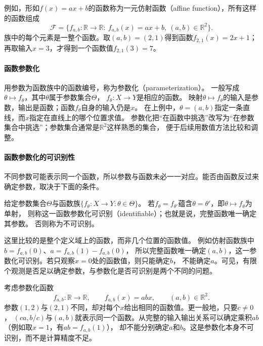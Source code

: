 例如，形如$f(x)=ax+b$的函数称为一元仿射函数（affine function），所有这样的函数组成
\[
 \mathcal F=\{f_{a,b}:\mathbb R\to\mathbb R:\ f_{a,b}(x)=ax+b,\ (a,b)\in\mathbb R^2\}.
\]
族中的每个元素是一整个函数。取$(a,b)=(2,1)$得到函数$f_{2,1}(x)=2x+1$；
再取输入$x=3$，才得到一个函数值$f_{2,1}(3)=7$。

\paragraph{函数参数化}
用参数为函数族中的函数编号，称为参数化（parameterization）。
一般写成$\theta\mapsto f_\theta$，其中$\theta$属于参数集合$\Theta$，
$f_\theta:X\to Y$是相应的函数。
映射$\theta\mapsto f_\theta$的输入是参数，输出是函数；函数$f_\theta$自身的输入仍是$x$。
在上例中，$\theta=(a,b)$指定一条直线，而$x$指定在直线上的哪个位置求值。
参数化把“在函数中挑选”改写为“在参数集合中挑选”；参数集合通常是$\mathbb R^2$这样熟悉的集合，
便于后续用数值方法比较和调整。

\paragraph{函数参数化的可识别性}
不同参数可能表示同一个函数，所以参数与函数未必一一对应。能否由函数反过来确定参数，取决于下面的条件。
\begin{definition}[函数参数化的可识别性]
\label{def:prelim-identifiable-parameterization}
给定参数集合$\Theta$与函数族$\{f_\theta:X\to Y:\theta\in\Theta\}$。
若$f_\theta=f_{\theta'}$蕴含$\theta=\theta'$，即$\theta\mapsto f_\theta$为单射，
则称这一函数参数化可识别（identifiable）；也就是说，完整函数唯一确定其参数。
否则称为不可识别。
\end{definition}
这里比较的是整个定义域上的函数，而非几个位置的函数值。
例如仿射函数族中$b=f_{a,b}(0)$、$a=f_{a,b}(1)-f_{a,b}(0)$，
所以完整函数唯一确定$(a,b)$，这一参数化可识别。若只观察$x=0$处的函数值，则只能确定$b$，
不能确定$a$。可见，有限个观测是否足以确定参数，与参数化是否可识别是两个不同的问题。

\begin{example}[参数不同而函数相同]
\label{ex:prelim-nonidentifiable-parameterization}
考虑参数化函数
\[
  f_{a,b}:\mathbb{R}\to\mathbb{R},
  \qquad
  f_{a,b}(x)=abx,
  \qquad
  (a,b)\in\mathbb{R}^2.
\]
参数$(1,2)$与$(2,1)$不同，却对每个$x$给出相同的函数值。更一般地，只要$c\neq0$，
$(ca,b/c)$与$(a,b)$就表示同一个函数。从完整的输入输出关系可以确定乘积$ab$（例如取$x=1$，有$ab=f_{a,b}(1)$），
却不能分别确定$a$和$b$。这是参数化本身不可识别，而不是计算精度不足。
\end{example}


